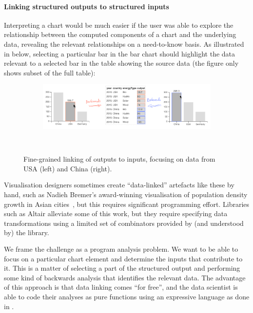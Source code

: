 \paragraph{Linking structured outputs to structured inputs}
Interpreting a chart would be much easier if the user was able to explore the relationship between the computed components of a chart and the underlying data, revealing the relevant relationships on a need-to-know basis. As illustrated in  below, selecting a particular bar in the bar chart should highlight the data relevant to a selected bar in the table showing the source data (the figure only shows subset of the full table):

\begin{figure}[H]
   \begin{subfigure}[b]{0.99\textwidth}
      \centering
      {\includegraphics[scale=0.36]{fig/example/data-linking-merged.png}}
   \end{subfigure}\\
   \begin{subfigure}{0.65\textwidth}
      \small
      
   \end{subfigure}
   \caption{Fine-grained linking of outputs to inputs, focusing on data from USA (left) and China (right). }
   \label{fig:introduction:data-linking}
\end{figure}

Visualisation designers sometimes create ``data-linked'' artefacts like these by hand, such as Nadieh Bremer's award-winning visualisation of population density growth in Asian cities~\cite{bremer15}, but this requires significant programming effort. Libraries such as Altair \cite{vanderPlas18} alleviate some of this work, but they require specifying data transformations using a limited set of combinators provided by (and understood by) the library.

We frame the challenge as a program analysis problem. We want to be able to focus on a particular chart element and determine the inputs that contribute to it. This is a matter of selecting a part of the structured output and performing some kind of backwards analysis that identifies the relevant data. The advantage of this approach is that data linking comes ``for free'', and the data scientist is able to code their analyses as pure functions using an expressive language as done in .

